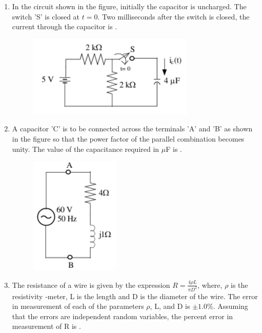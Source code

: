 \documentclass[journal,12pt,onecolumn]{IEEEtran}
\theoremstyle{remark}
\begin{document}
\begin{enumerate}
    \item In the circuit shown in the figure, initially the capacitor is uncharged. The switch 'S' is closed at $t=0$. Two milliseconds after the switch is closed, the current through the capacitor  is \underline{\hspace{2cm}}.
    \begin{figure}[H]
        \centering
        \includegraphics[width=0.4\columnwidth]{q29}
        \caption*{}
        \label{Q29}
    \end{figure}

    \hfill{}
    
    \item A capacitor 'C' is to be connected across the terminals 'A' and 'B' as shown in the figure so that the power factor of the parallel combination becomes unity. The value of the capacitance required in $\mu$F is \underline{\hspace{2cm}}.
    \begin{figure}[H]
        \centering
        \includegraphics[width=0.4\columnwidth]{q30}
        \caption*{}
        \label{Q30}
    \end{figure}

    \hfill{}
    
    \item The resistance of a wire is given by the expression $R = \frac{4\rho L}{\pi D^2}$, where, $\rho$ is the resistivity \brak{\ohm}-meter, L is the length  and D  is the diameter of the wire. The error in measurement of each of the parameters $\rho$, L, and D is $\pm1.0\%$. Assuming that the errors are independent random variables, the percent error in measurement of R is \underline{\hspace{2cm}}.


\end{enumerate}
\end{document}
